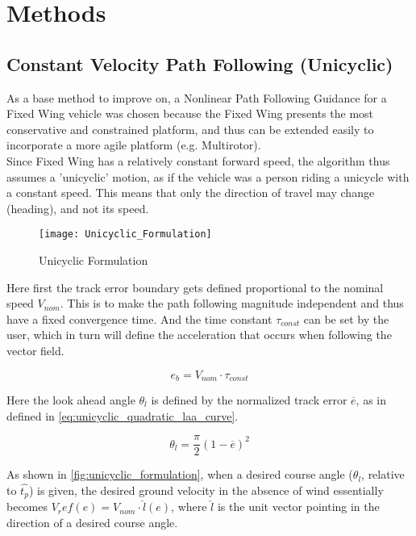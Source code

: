 \chapter{Methods}
\label{ch:methods}

\section{Constant Velocity Path Following (Unicyclic)}

As a base method to improve on, a Nonlinear Path Following Guidance\cite{stastny_flying_2019} for a Fixed Wing vehicle was chosen because the Fixed Wing presents the most conservative and constrained platform, and thus can be extended easily to incorporate a more agile platform (e.g. Multirotor).\\

Since Fixed Wing has a relatively constant forward speed, the algorithm thus assumes a 'unicyclic' motion, as if the vehicle was a person riding a unicycle with a constant speed. This means that only the direction of travel may change (heading), and not its speed.

\begin{figure}[h]
\centering
\texttt{[image: Unicyclic\_Formulation]}
\caption{Unicyclic Formulation}
\label{fig:unicyclic_formulation}
\end{figure}

Here first the track error boundary gets defined proportional to the nominal speed $V_{nom}$. This is to make the path following magnitude independent and thus have a fixed convergence time. And the time constant $\tau_{const}$ can be set by the user, which in turn will define the acceleration that occurs when following the vector field.

\begin{equation}
    e_b = V_{nom} \cdot \tau_{const}
\label{eq:unicyclic_track_error_boundary}
\end{equation}

Here the look ahead angle $\theta_l$ is defined by the normalized track error $\overline{e}$, as in \cite{stastny_low-altitude_2020} defined in \autoref{eq:unicyclic_quadratic_laa_curve}.

\begin{equation}
    \theta_l = \frac{\pi}{2}(1-\overline{e})^2
\label{eq:unicyclic_quadratic_laa_curve}
\end{equation}

As shown in \autoref{fig:unicyclic_formulation}, when a desired course angle ($\theta_l$, relative to $\hat{t_p}$) is given, the desired ground velocity in the absence of wind essentially becomes $V_ref(e) = V_{nom} \cdot \hat{l}(e)$, where $\hat{l}$ is the unit vector pointing in the direction of a desired course angle.\\

